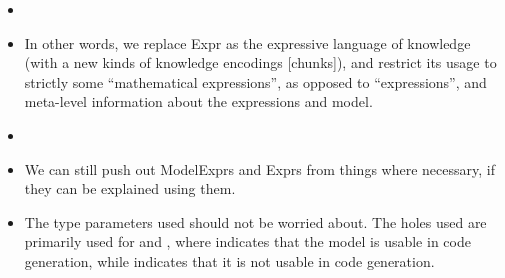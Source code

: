 \begin{itemize}
\begin{itemize}
		      \item \currentModelKindsHaskell{}

		      \item In other words, we replace Expr as the expressive language
		            of knowledge (with a new kinds of knowledge encodings
			            [chunks]), and restrict its usage to strictly some
		            ``mathematical expressions'', as opposed to ``expressions'',
		            and meta-level information about the expressions and model.

		      \item {}

		      \item We can still push out ModelExprs and Exprs from things where
		            necessary, if they can be explained using them.

		      \item The type parameters used should not be worried about. The
		            holes used are primarily used for \Expr{} and \ModelExpr{}, where
		            \Expr{} indicates that the model is usable in code generation,
		            while \ModelExpr{} indicates that it is not usable in code
		            generation.

	      \end{itemize}

\end{itemize}


